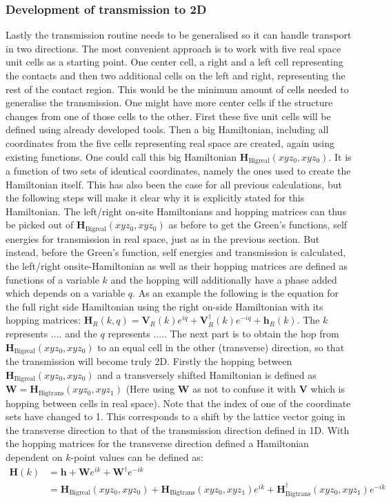\subsubsection{Development of transmission to 2D}
Lastly the transmission routine needs to be generalised so it can handle transport in two directions. The most convenient approach is to work with five real space unit cells as a starting point. One center cell, a right and a left cell representing the contacts and then two additional cells on the left and right, representing the rest of the contact region. This would be the minimum amount of cells needed to generalise the transmission. One might have more center cells if the structure changes from one of those cells to the other. First these five unit cells will be defined using already developed tools. Then a big Hamiltonian, including all coordinates from the five cells representing real space are created, again using existing functions. One could call this big Hamiltonian \(\textbf{H}_{\text{Bigreal}}(xyz_0,xyz_0)\). It is a function of two sets of identical coordinates, namely the ones used to create the Hamiltonian itself. This has also been the case for all previous calculations, but the following steps will make it clear why it is explicitly stated for this Hamiltonian. The left/right on-site Hamiltonians and hopping matrices can thus be picked out of \(\textbf{H}_{\text{Bigreal}}(xyz_0,xyz_0)\) as before to get the Green's functions, self energies for transmission in real space, just as in the previous section. But instead, before the Green's function, self energies and transmission is calculated, the left/right onsite-Hamiltonian as well as their hopping matrices are defined as functions of a variable \(k\) and the hopping will additionally have a phase added which depends on a variable \(q\). As an example the following is the equation for the full right side Hamiltonian using the right on-side Hamiltonian with its hopping matrices: \(\textbf{H}_R(k,q) = \textbf{V}_R(k)e^{iq}+\textbf{V}^{\dagger}_R(k)e^{-iq}+\textbf{h}_R(k)\). The \(k\) represents .... and the \(q\) represents ..... The next part is to obtain
the hop from \(\textbf{H}_{\text{Bigreal}}(xyz_0,xyz_0)\) to an equal cell in the other (transverse) direction, so that the transmission will become truly 2D. Firstly the hopping between \(\textbf{H}_{\text{Bigreal}}(xyz_0,xyz_0)\) and a transversely shifted Hamiltonian is defined as \(\textbf{W} = \textbf{H}_{\text{Bigtrans}}(xyz_0,xyz_1)\) (Here using \textbf{W} as not to confuse it with \textbf{V} which is hopping between cells in real space). Note that the index of one of the coordinate sets have changed to 1. This corresponds to a shift by the lattice vector going in the transverse direction to that of the transmission direction defined in 1D. With the hopping matrices for the transverse direction defined a Hamiltonian dependent on \(k\)-point values can be defined as:\begin{align}
    \textbf{H}(k) &= \textbf{h}+\textbf{W}e^{ik}+\textbf{W}^{\dagger}e^{-ik}\\
    &= \textbf{H}_{\text{Bigreal}}(xyz_0,xyz_0) + \textbf{H}_{\text{Bigtrans}}(xyz_0,xyz_1)e^{ik}+\textbf{H}_{\text{Bigtrans}}^{\dagger}(xyz_0,xyz_1)e^{-ik}
\end{align}
